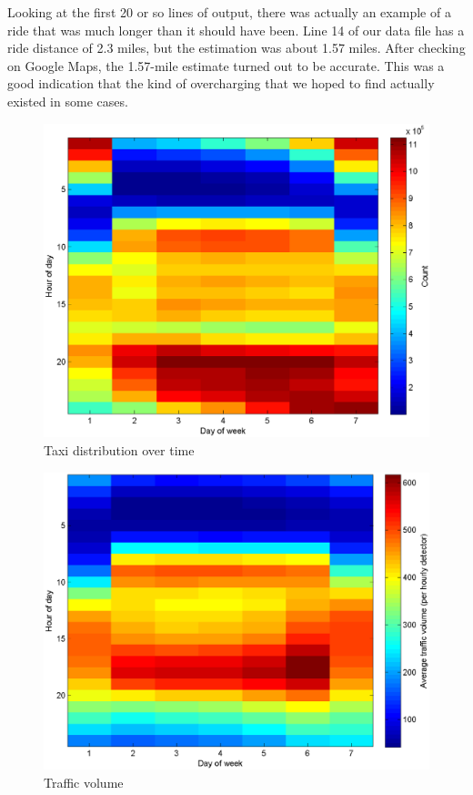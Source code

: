 \documentclass{sig-alternate}
\begin{document}
Looking at the first 20 or so lines of output, there was actually an example of a ride that was much longer than it should have been.  Line 14 of our data file has a ride distance of 2.3 miles, but the estimation was about 1.57 miles. After checking on Google Maps, the 1.57-mile estimate turned out to be accurate.  This was a good indication that the kind of overcharging that we hoped to find actually existed in some cases.


\begin{figure}
\includegraphics[scale=.20]{tgrid.eps}
\caption{Taxi distribution over time}
\end{figure}

\begin{figure}
\includegraphics[scale=.20]{trgrid.eps}
\caption{Traffic volume}
\end{figure}
\end{document}
